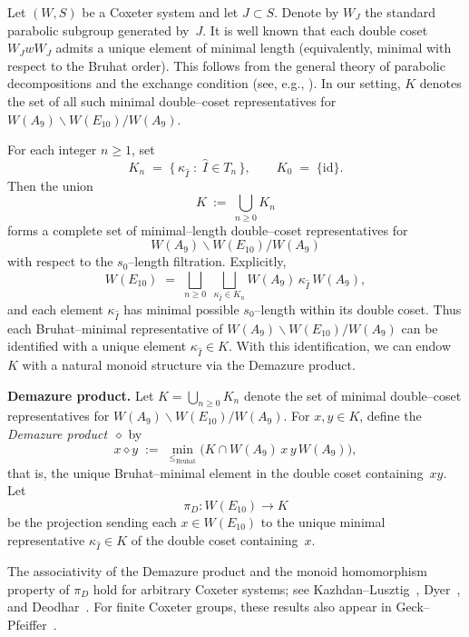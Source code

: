 \documentclass[11pt]{amsart}
\numberwithin{equation}{section}
\begin{document}
\medskip
Let $(W,S)$ be a Coxeter system and let $J \subset S$. 
Denote by $W_J$ the standard parabolic subgroup generated by~$J$.
It is well known \cite[Proposition~2.7(a)]{Billey:2018} that each double coset $W_J w W_J$ admits a unique
element of minimal length (equivalently, minimal with respect to the Bruhat order).
This follows from the general theory of parabolic
decompositions and the exchange condition
(see, e.g., \cite{Humphreys1990,Kazhdan-Lusztig,BjornerBrenti,Soergel1990,Deodhar1987,Dyer1991}).
In our setting, \(K\) denotes the set of all such minimal double--coset
representatives for \(W(A_9)\backslash W(E_{10})/W(A_9)\).

\medskip
For each integer \(n\ge 1\), set
\[
K_n \;=\; \{\, \kappa_{\widehat I} \;:\; \widehat I\in T_n \,\},
\qquad
K_0 \;=\; \{\mathrm{id}\}.
\]
Then the union
\[
K\ :=\ \bigcup_{n\ge 0} K_n
\]
forms a complete set of minimal--length double--coset representatives for
\[
W(A_9)\backslash W(E_{10})/W(A_9)
\]
with respect to the $s_0$--length filtration.  Explicitly,
\[
W(E_{10})
\;=\;
\bigsqcup_{n\ge 0}\;
\bigsqcup_{\kappa_{\widehat I}\in K_n}
W(A_9)\,\kappa_{\widehat I}\,W(A_9),
\]
and each element $\kappa_{\widehat I}$ has minimal possible $s_0$--length within its double coset.
Thus each Bruhat--minimal representative of
\(W(A_9)\backslash W(E_{10})/W(A_9)\) can be identified with a unique
element \(\kappa_{\widehat I}\in K\).
With this identification, we can endow \(K\) with a natural monoid structure
via the Demazure product.

\medskip
\noindent\textbf{Demazure product.}
Let \(K=\bigcup_{n\ge0} K_n\) denote the set of minimal double--coset
representatives for \(W(A_9)\backslash W(E_{10})/W(A_9)\).
For \(x,y\in K\), define the \emph{Demazure product}~$\diamond$ by
\[
x \diamond y
\;:=\;
\min_{\le_{\mathrm{Bruhat}}}
\bigl(K\cap W(A_9)\,x\,y\,W(A_9)\bigr),
\]
that is, the unique Bruhat--minimal element in the double coset containing~\(xy\).
Let
\[
\pi_D \colon W(E_{10}) \longrightarrow K
\]
be the projection sending each \(x\in W(E_{10})\) to the unique
minimal representative \(\kappa_{\widehat I}\in K\)
of the double coset containing~\(x\).

\medskip
The associativity of the Demazure product and the monoid homomorphism
property of $\pi_D$ hold for arbitrary Coxeter systems; see
Kazhdan--Lusztig~\cite{Kazhdan-Lusztig}, Dyer~\cite{Dyer1991}, and
Deodhar~\cite{Deodhar1987}. For finite Coxeter groups, these results
also appear in Geck--Pfeiffer~\cite[Chap.~8]{GeckPfeiffer}.
\end{document}
